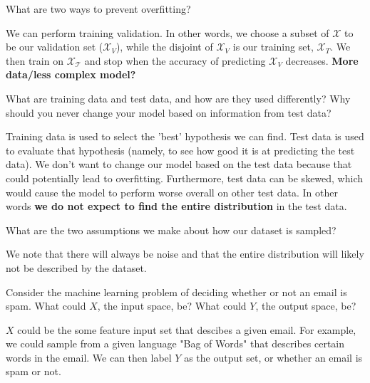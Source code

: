 \begin{problem}[2]
  What are two ways to prevent overfitting?
\end{problem}
\begin{solution}
  We can perform training validation. In other words, we choose a subset of $\mathcal{X}$ to be our validation set ($\mathcal{X}_V$), while the disjoint of $\mathcal{X}_V$ is our training set, $\mathcal{X}_T$. We then train on $\mathcal{X_T}$ and stop when the accuracy of predicting $\mathcal{X}_V$ decreases. \textbf{More data/less complex model?}
\end{solution}

\begin{problem}[2]
  What are training data and test data, and how are they used differently? Why should you never change your model based on information from test data?
\end{problem}
\begin{solution}
  Training data is used to select the 'best' hypothesis we can find. Test data is used to evaluate that hypothesis (namely, to see how good it is at predicting the test data). We don't want to change our model based on the test data because that could potentially lead to overfitting. Furthermore, test data can be skewed, which would cause the model to perform worse overall on other test data. In other words \textbf{we do not expect to find the entire distribution} in the test data.
\end{solution}
\newpage

\begin{problem}[2]
  What are the two assumptions we make about how our dataset is sampled?
\end{problem}
\begin{solution}
    We note that there will always be noise and that the entire distribution will likely not be described by the dataset.
\end{solution}

\begin{problem}[2]
  Consider the machine learning problem of deciding whether or not an email is spam. What could $X$, the input space, be? What could $Y$, the output space, be?
\end{problem}
\begin{solution}
  $X$ could be the some feature input set that descibes a given email. For example, we could sample from a given language "Bag of Words" that describes certain words in the email. We can then label $Y$ as the output set, or whether an email is spam or not. 
\end{solution}

